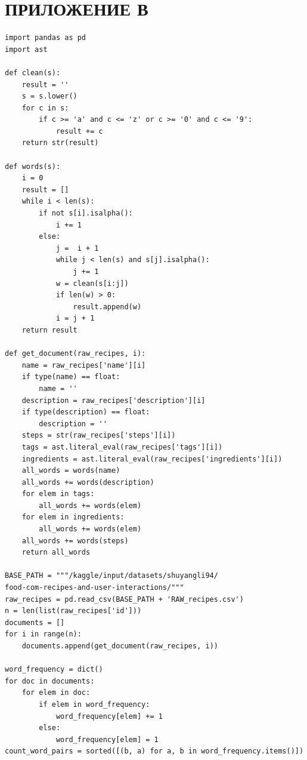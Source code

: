 \chapter*{ПРИЛОЖЕНИЕ В}
\begin{lstlisting}[caption={Определение множества всех слов в наборе рецептов и количеств каждого слова}, label={lst:rvec_1}]
import pandas as pd
import ast

def clean(s):
    result = ''
    s = s.lower()
    for c in s:
        if c >= 'a' and c <= 'z' or c >= '0' and c <= '9':
            result += c
    return str(result)

def words(s):
    i = 0
    result = []
    while i < len(s):
        if not s[i].isalpha():
            i += 1
        else:
            j =  i + 1
            while j < len(s) and s[j].isalpha():
                j += 1
            w = clean(s[i:j])
            if len(w) > 0:
                result.append(w)
            i = j + 1
    return result

def get_document(raw_recipes, i):
    name = raw_recipes['name'][i]
    if type(name) == float:
        name = ''
    description = raw_recipes['description'][i]
    if type(description) == float:
        description = ''    
    steps = str(raw_recipes['steps'][i])
    tags = ast.literal_eval(raw_recipes['tags'][i])
    ingredients = ast.literal_eval(raw_recipes['ingredients'][i])
    all_words = words(name)
    all_words += words(description)
    for elem in tags:
        all_words += words(elem)
    for elem in ingredients:
        all_words += words(elem)
    all_words += words(steps)
    return all_words

BASE_PATH = """/kaggle/input/datasets/shuyangli94/
food-com-recipes-and-user-interactions/"""
raw_recipes = pd.read_csv(BASE_PATH + 'RAW_recipes.csv')
n = len(list(raw_recipes['id']))
documents = []
for i in range(n):
    documents.append(get_document(raw_recipes, i))

word_frequency = dict()
for doc in documents:
    for elem in doc:
        if elem in word_frequency:
            word_frequency[elem] += 1
        else:
            word_frequency[elem] = 1
count_word_pairs = sorted([(b, a) for a, b in word_frequency.items()])
\end{lstlisting}


